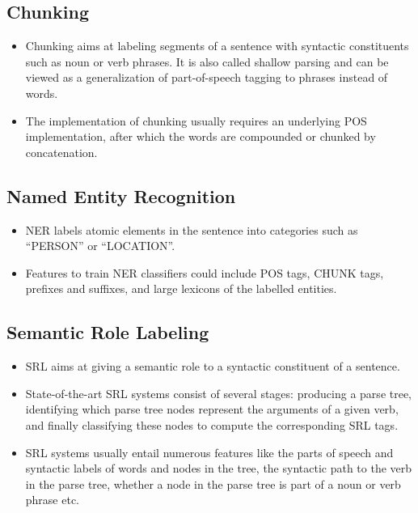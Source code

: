 \documentclass[11pt,a4paper]{article}
\begin{document}

  \subsection{Chunking} %
  \label{sub:chunking}

    \begin{itemize}
      \item 
      Chunking aims at labeling segments of a sentence with syntactic constituents such as noun or verb phrases. It is also called shallow parsing and can be viewed as a generalization of part-of-speech tagging to phrases instead of words.
      \item 
      The implementation of chunking usually requires an underlying POS implementation, after which the words are compounded or chunked by concatenation.
    \end{itemize}
  

  \subsection{Named Entity Recognition} %
  \label{sub:named_entity_recognition}
  
    \begin{itemize}
      \item 
      NER labels atomic elements in the sentence into categories such as “PERSON” or “LOCATION”.
      \item 
      Features to train NER classifiers could include POS tags, CHUNK tags, prefixes and suffixes, and large lexicons of the labelled entities. 
    \end{itemize}


  \subsection{Semantic Role Labeling} %
  \label{sub:semantic_role_labeling}
  
    \begin{itemize}
      \item 
      SRL aims at giving a semantic role to a syntactic constituent of a sentence.
      \item 
      State-of-the-art SRL systems consist of several stages: producing a parse tree, identifying which parse tree nodes represent the arguments of a given verb, and finally classifying these nodes to compute the corresponding SRL tags.
      \item 
      SRL systems usually entail numerous features like the parts of speech and syntactic labels of words and nodes in the tree, the syntactic path to the verb in the parse tree, whether a node in the parse tree is part of a noun or verb phrase etc.
    \end{itemize}
\end{document}
